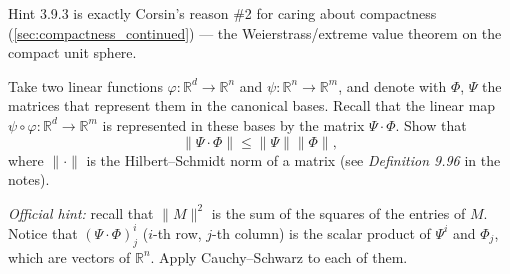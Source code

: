 \begin{remark}
Hint 3.9.3 is exactly Corsin's reason \#2 for caring about compactness
(\cref{sec:compactness_continued}) --- the Weierstrass/extreme value theorem on the compact unit
sphere.
\end{remark}

\begin{exercise}
\label{ex:3.10}
Take two linear functions $\varphi : \mathbb{R}^d \to \mathbb{R}^n$ and
$\psi : \mathbb{R}^n \to \mathbb{R}^m$, and denote with $\Phi$, $\Psi$ the matrices that represent
them in the canonical bases. Recall that the linear map
$\psi \circ \varphi : \mathbb{R}^d \to \mathbb{R}^m$ is represented in these bases by the matrix
$\Psi \cdot \Phi$. Show that
$$\|\Psi \cdot \Phi\| \leq \|\Psi\|\|\Phi\|,$$
where $\|\cdot\|$ is the Hilbert--Schmidt norm of a matrix (see \textit{Definition 9.96} in the
notes).

\textit{Official hint:} recall that $\|M\|^2$ is the sum of the squares of the entries of $M$.
Notice that $(\Psi\cdot\Phi)^i_j$ ($i$-th row, $j$-th column) is the scalar product of $\Psi^i$
and $\Phi_j$, which are vectors of $\mathbb{R}^n$. Apply Cauchy--Schwarz to each of them.
\end{exercise}

